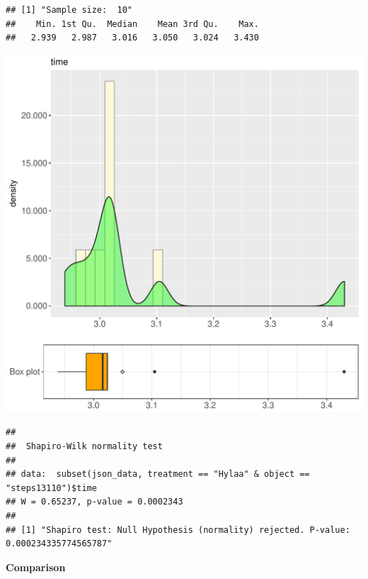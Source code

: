 \documentclass{article}\usepackage[]{graphicx}\usepackage[]{color}
\makeatletter
\def\maxwidth{ %
  \ifdim\Gin@nat@width>\linewidth
    \linewidth
  \else
    \Gin@nat@width
  \fi
}
\newenvironment{kframe}{%
 \def\at@end@of@kframe{}%
 \ifinner\ifhmode%
  \def\at@end@of@kframe{\end{minipage}}%
  \begin{minipage}{\columnwidth}%
 \fi\fi%
 \def\FrameCommand##1{\hskip\@totalleftmargin \hskip-\fboxsep
 \colorbox{shadecolor}{##1}\hskip-\fboxsep
     \hskip-\linewidth \hskip-\@totalleftmargin \hskip\columnwidth}%
 \MakeFramed {\advance\hsize-\width
   \@totalleftmargin\z@ \linewidth\hsize
   \@setminipage}}%
 {\par\unskip\endMakeFramed%
 \at@end@of@kframe}
\newenvironment{knitrout}{}{} %
\makeatother
\begin{document}
\begin{knitrout}
\color{fgcolor}\begin{kframe}
\begin{verbatim}
## [1] "Sample size:  10"
##    Min. 1st Qu.  Median    Mean 3rd Qu.    Max. 
##   2.939   2.987   3.016   3.050   3.024   3.430
\end{verbatim}
\end{kframe}
\includegraphics[width=\maxwidth]{figure/RH2_Hylaa_steps13110-1} 
\begin{kframe}\begin{verbatim}
## 
## 	Shapiro-Wilk normality test
## 
## data:  subset(json_data, treatment == "Hylaa" & object == "steps13110")$time
## W = 0.65237, p-value = 0.0002343
## 
## [1] "Shapiro test: Null Hypothesis (normality) rejected. P-value: 0.000234335774565787"
\end{verbatim}
\end{kframe}
\end{knitrout}
  
 \textbf{Comparison}
  
\end{document}

